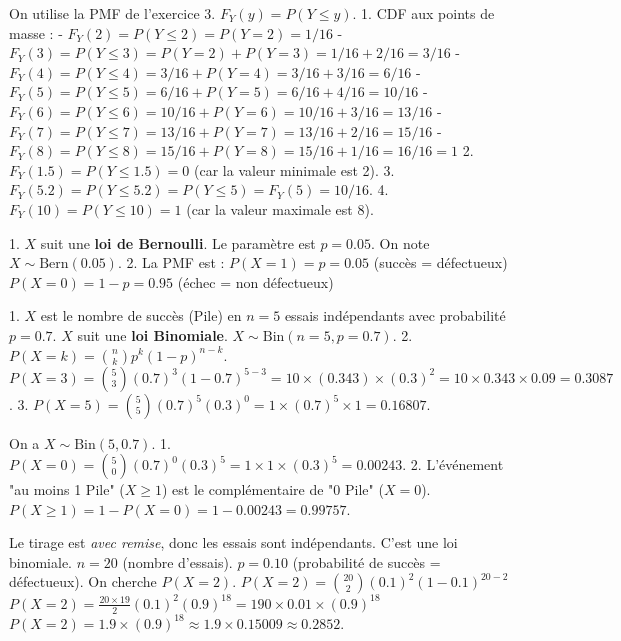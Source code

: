 \begin{correctionbox}
On utilise la PMF de l'exercice 3. $F_Y(y) = P(Y \le y)$.
1.  CDF aux points de masse :
    - $F_Y(2) = P(Y \le 2) = P(Y=2) = 1/16$
    - $F_Y(3) = P(Y \le 3) = P(Y=2)+P(Y=3) = 1/16 + 2/16 = 3/16$
    - $F_Y(4) = P(Y \le 4) = 3/16 + P(Y=4) = 3/16 + 3/16 = 6/16$
    - $F_Y(5) = P(Y \le 5) = 6/16 + P(Y=5) = 6/16 + 4/16 = 10/16$
    - $F_Y(6) = P(Y \le 6) = 10/16 + P(Y=6) = 10/16 + 3/16 = 13/16$
    - $F_Y(7) = P(Y \le 7) = 13/16 + P(Y=7) = 13/16 + 2/16 = 15/16$
    - $F_Y(8) = P(Y \le 8) = 15/16 + P(Y=8) = 15/16 + 1/16 = 16/16 = 1$
2.  $F_Y(1.5) = P(Y \le 1.5) = 0$ (car la valeur minimale est 2).
3.  $F_Y(5.2) = P(Y \le 5.2) = P(Y \le 5) = F_Y(5) = 10/16$.
4.  $F_Y(10) = P(Y \le 10) = 1$ (car la valeur maximale est 8).
\end{correctionbox}


\begin{correctionbox}
1.  $X$ suit une \textbf{loi de Bernoulli}. Le paramètre est $p=0.05$. On note $X \sim \text{Bern}(0.05)$.
2.  La PMF est :
    $P(X=1) = p = 0.05$ (succès = défectueux)
    $P(X=0) = 1-p = 0.95$ (échec = non défectueux)
\end{correctionbox}

\begin{correctionbox}
1.  $X$ est le nombre de succès (Pile) en $n=5$ essais indépendants avec probabilité $p=0.7$.
    $X$ suit une \textbf{loi Binomiale}. $X \sim \text{Bin}(n=5, p=0.7)$.
2.  $P(X=k) = \binom{n}{k} p^k (1-p)^{n-k}$.
    $P(X=3) = \binom{5}{3} (0.7)^3 (1-0.7)^{5-3} = 10 \times (0.343) \times (0.3)^2 = 10 \times 0.343 \times 0.09 = 0.3087$.
3.  $P(X=5) = \binom{5}{5} (0.7)^5 (0.3)^0 = 1 \times (0.7)^5 \times 1 = 0.16807$.
\end{correctionbox}

\begin{correctionbox}
On a $X \sim \text{Bin}(5, 0.7)$.
1.  $P(X=0) = \binom{5}{0} (0.7)^0 (0.3)^5 = 1 \times 1 \times (0.3)^5 = 0.00243$.
2.  L'événement "au moins 1 Pile" ($X \ge 1$) est le complémentaire de "0 Pile" ($X=0$).
    $P(X \ge 1) = 1 - P(X=0) = 1 - 0.00243 = 0.99757$.
\end{correctionbox}

\begin{correctionbox}
Le tirage est \textit{avec remise}, donc les essais sont indépendants. C'est une loi binomiale.
$n = 20$ (nombre d'essais).
$p = 0.10$ (probabilité de succès = défectueux).
On cherche $P(X=2)$.
$P(X=2) = \binom{20}{2} (0.1)^2 (1-0.1)^{20-2}$
$P(X=2) = \frac{20 \times 19}{2} (0.1)^2 (0.9)^{18} = 190 \times 0.01 \times (0.9)^{18}$
$P(X=2) = 1.9 \times (0.9)^{18} \approx 1.9 \times 0.15009 \approx 0.2852$.
\end{correctionbox}

